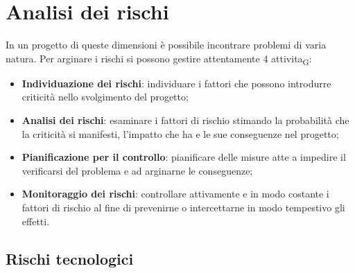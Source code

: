\section{Analisi dei rischi}

In un progetto di queste dimensioni è possibile incontrare problemi di varia natura. Per arginare i rischi si possono gestire attentamente 4 \gls{attivita}\textsubscript{G}:

\begin{itemize}
	\item \textbf{Individuazione dei rischi}: individuare i fattori che possono introdurre criticità nello svolgimento del progetto;
	\item \textbf{Analisi dei rischi}: esaminare i fattori di rischio stimando la probabilità che la criticità si manifesti, l'impatto che ha e le sue conseguenze nel progetto;
	\item \textbf{Pianificazione per il controllo}: pianificare delle misure atte a impedire il verificarsi del problema e ad arginarne le conseguenze;
	\item \textbf{Monitoraggio dei rischi}: controllare attivamente e in modo costante i fattori di rischio al fine di prevenirne o intercettarne in modo tempestivo gli effetti.
\end{itemize}


\subsection{Rischi tecnologici}




